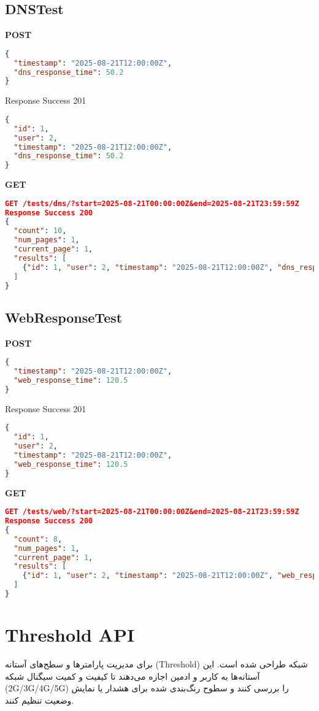 \documentclass{report}
\begin{document}
\subsection{DNSTest}
\textbf{POST}
\begin{lstlisting}[language=json]
{
  "timestamp": "2025-08-21T12:00:00Z",
  "dns_response_time": 50.2
}
\end{lstlisting}

Response Success 201
\begin{lstlisting}[language=json]
{
  "id": 1,
  "user": 2,
  "timestamp": "2025-08-21T12:00:00Z",
  "dns_response_time": 50.2
}
\end{lstlisting}

\textbf{GET}
\begin{lstlisting}[language=json]
GET /tests/dns/?start=2025-08-21T00:00:00Z&end=2025-08-21T23:59:59Z
Response Success 200
{
  "count": 10,
  "num_pages": 1,
  "current_page": 1,
  "results": [
    {"id": 1, "user": 2, "timestamp": "2025-08-21T12:00:00Z", "dns_response_time": 50.2}
  ]
}
\end{lstlisting}

\subsection{WebResponseTest}
\textbf{POST}
\begin{lstlisting}[language=json]
{
  "timestamp": "2025-08-21T12:00:00Z",
  "web_response_time": 120.5
}
\end{lstlisting}

Response Success 201
\begin{lstlisting}[language=json]
{
  "id": 1,
  "user": 2,
  "timestamp": "2025-08-21T12:00:00Z",
  "web_response_time": 120.5
}
\end{lstlisting}

\textbf{GET}
\begin{lstlisting}[language=json]
GET /tests/web/?start=2025-08-21T00:00:00Z&end=2025-08-21T23:59:59Z
Response Success 200
{
  "count": 8,
  "num_pages": 1,
  "current_page": 1,
  "results": [
    {"id": 1, "user": 2, "timestamp": "2025-08-21T12:00:00Z", "web_response_time": 120.5}
  ]
}
\end{lstlisting}
\section{Threshold API}
برای مدیریت پارامترها و سطح‌های آستانه (Threshold) شبکه طراحی شده است. این آستانه‌ها به کاربر و ادمین اجازه می‌دهند تا کیفیت و کمیت سیگنال شبکه (2G/3G/4G/5G) را بررسی کنند و سطوح رنگ‌بندی شده برای هشدار یا نمایش وضعیت تنظیم کنند.
\end{document}
